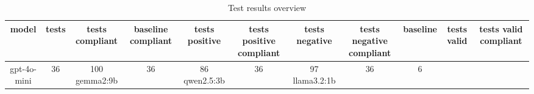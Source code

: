 
  \begin{table}[h!]
  \centering
  \begin{tabular}{|c|c|c|c|c|c|c|c|c|c|c|}
  \hline
  model & tests & tests compliant & baseline compliant & tests positive & tests positive compliant & tests negative & tests negative compliant & baseline & tests valid & tests valid compliant \\
  \hline
  gpt-4o-mini & 36 & 100%
\hline
gemma2:9b & 36 & 86%
\hline
qwen2.5:3b & 36 & 97%
\hline
llama3.2:1b & 36 & 6%
  \end{tabular}
  \caption{Test results overview}
  
  \end{table}
  